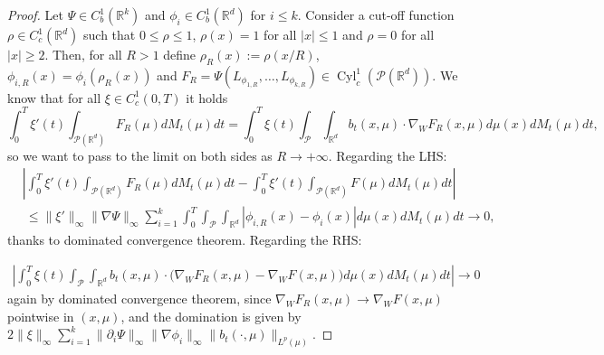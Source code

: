 \documentclass[10pt,leqno]{amsart}
\numberwithin{equation}{section}
\newcommand{\R}{\mathbb{R}}
\newcommand{\PP}{\mathcal{P}}
\begin{document}
\begin{proof}
    Let $\Psi\in C_b^1(\R^k)$ and $\phi_i \in C_b^1(\R^d)$ for $i\leq k$. Consider a cut-off function $\rho\in C^1_c(\R^d)$ such that $0\leq\rho\leq 1$, $\rho(x) = 1$ for all $|x|\leq1$ and $\rho=0$ for all $|x|\geq 2$. Then, for all $R>1$ define $\rho_R(x) := \rho(x/R)$, $\phi_{i,R}(x) = \phi_i(\rho_R(x))$ and $F_R = \Psi(L_{\phi_{1,R}},\dots,L_{\phi_{k,R}}) \in \operatorname{Cyl}_c^1(\PP(\R^d))$. We know that for all $\xi\in C_c^1(0,T)$ it holds
    \[\int_0^T \xi'(t)\int_{\PP(\R^d)} F_R(\mu) dM_t(\mu) dt = \int_0^T \xi(t)\int_{\PP} \int_{\R^d} b_t(x,\mu)\cdot \nabla_W F_R(x,\mu)d\mu(x)dM_t(\mu) dt,\]
    so we want to pass to the limit on both sides as $R\to+\infty$.
    Regarding the LHS:
    \begin{align*}
        & \left|  \int_0^T \xi'(t)\int_{\PP(\R^d)} F_R(\mu) dM_t(\mu) dt - \int_0^T \xi'(t)\int_{\PP(\R^d)} F(\mu) dM_t(\mu) dt \right|
        \\
        & \ \leq 
        \|\xi'\|_\infty \|\nabla\Psi\|_\infty \sum_{i=1}^k \int_0^T \int_{\PP} \int_{\R^d} |\phi_{i,R}(x) - \phi_i(x)| d\mu(x) dM_t(\mu) dt \to 0,
    \end{align*}
    thanks to dominated convergence theorem. Regarding the RHS:
     

    \begin{align*}
        \left|\int_0^T \xi(t)\int_{\PP} \int_{\R^d} b_t(x,\mu)\cdot \big(\nabla_W F_R(x,\mu)-\nabla_W F(x,\mu)\big)d\mu(x) dM_t(\mu) dt \right|\to 0
    \end{align*}
    again by dominated convergence theorem, since $\nabla_W F_R(x,\mu) \to \nabla_WF(x,\mu)$ pointwise in $(x,\mu)$, and the domination is given by $2\|\xi\|_\infty\sum_{i=1}^k\|\partial_i \Psi\|_\infty\|\nabla\phi_i\|_\infty \|b_t(\cdot,\mu)\|_{L^p(\mu)}$. 
\end{proof}
\end{document}
